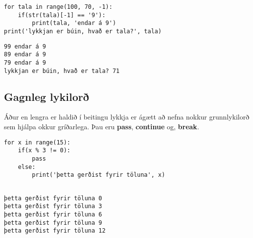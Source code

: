 \lstset{style=venjulegt}
\begin{lstlisting}[caption=for lykkja range() fallið notað til að telja aftur á bak, label=lst:lykkjur-range-mest]
for tala in range(100, 70, -1):
	if(str(tala)[-1] == '9'):
		print(tala, 'endar á 9')
print('lykkjan er búin, hvað er tala?', tala)
\end{lstlisting}

\lstset{style=uttak}
\begin{lstlisting}
99 endar á 9
89 endar á 9
79 endar á 9
lykkjan er búin, hvað er tala? 71
\end{lstlisting}
\lstset{style=venjulegt}

\subsection{Gagnleg lykilorð}\label{uk:lykkjulykilorð}
	Áður en lengra er haldið í beitingu lykkja er ágætt að nefna nokkur grunnlykilorð sem hjálpa okkur gríðarlega.
	Þau eru \textbf{pass}, \textbf{continue} og, \textbf{break}.

\lstset{style=venjulegt}
\begin{lstlisting}[caption=Lykilorðið pass notað með for lykkju, label=lst:lykkjur-for-pass]
for x in range(15):
	if(x % 3 != 0):
		pass
	else:
		print('þetta gerðist fyrir töluna', x)
		
\end{lstlisting}
\lstset{style=uttak}
\begin{lstlisting}
þetta gerðist fyrir töluna 0
þetta gerðist fyrir töluna 3
þetta gerðist fyrir töluna 6
þetta gerðist fyrir töluna 9
þetta gerðist fyrir töluna 12
\end{lstlisting}

